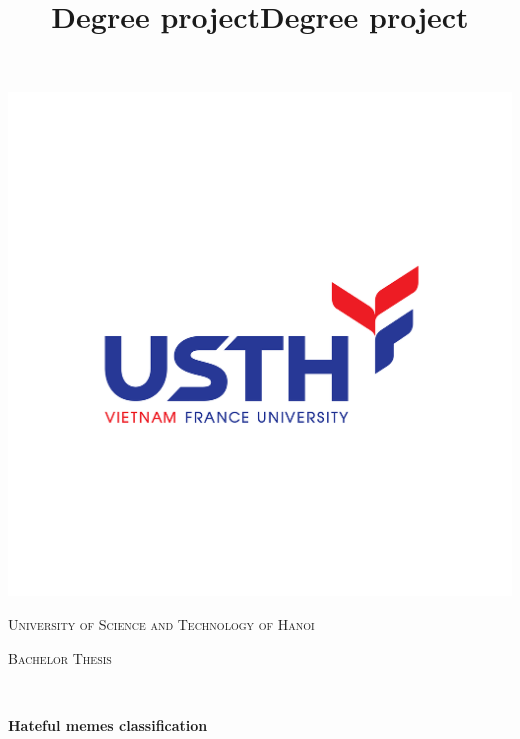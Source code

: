 \documentclass[12pt, twoside]{book}
\title{Degree project}
\title{Degree project}
\begin{document}
\linespread{1.25}

\thispagestyle{firststyle}
\begin{center}
  \begin{minipage}{0.48\textwidth} 
    \begin{center}
        \includegraphics[scale = 0.2]{images/usth_logo.png}
    \end{center}
  \end{minipage}
  \vspace*{-3cm}

  \vspace*{1cm}

  \textsc{\Large University of Science and Technology of Hanoi}\\[1.5cm]

  \begin{minipage}{0.9\textwidth} 
    \begin{center}
      \textsc{\LARGE Bachelor Thesis}
    \end{center}
  \end{minipage}\\[0.5cm]
  
  \vspace*{1cm}

  { \huge \bfseries Hateful memes classification}\\[0.4cm]	


\end{center}
\end{document}
